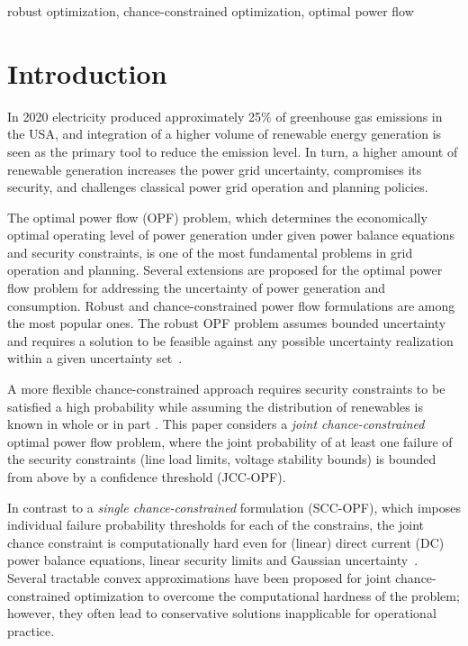 \documentclass{IEEEtran4PSCC}
\begin{document}
\begin{IEEEkeywords}
robust optimization, chance-constrained optimization, optimal power flow
\end{IEEEkeywords}



\section{Introduction}

In 2020 electricity produced approximately 25\% of greenhouse gas emissions in the USA, and integration of a higher volume of renewable energy generation is seen as the primary tool to reduce the emission level. In turn, a higher amount of renewable generation increases the power grid uncertainty, compromises its security, and challenges classical power grid operation and planning policies. 

The optimal power flow (OPF) problem, which determines the economically optimal operating level of power generation under given power balance equations and security constraints, is one of the most fundamental problems in grid operation and planning. Several extensions are proposed for the optimal power flow problem for addressing the uncertainty of power generation and consumption. Robust and chance-constrained power flow formulations are among the most popular ones. The robust OPF problem assumes bounded uncertainty and requires a solution to be feasible against any possible uncertainty realization within a given uncertainty set~\cite{ben2002robust,ding2016adjustable,sousa2010robust}. 

A more flexible chance-constrained approach requires security constraints to be satisfied a high probability while assuming the distribution of renewables is known in whole or in part \cite{lubin2015robust, roald2017chance,bienstock2014chance,pena2020dc}. This paper considers a {\it joint chance-constrained} optimal power flow problem, where the joint probability of at least one failure of the security constraints (line load limits, voltage stability bounds) is bounded from above by a confidence threshold (JCC-OPF). 

In contrast to a {\it single chance-constrained} formulation (SCC-OPF), which imposes individual failure probability thresholds for each of the constrains, the joint chance constraint is computationally hard even for (linear) direct current (DC) power balance equations, linear security limits and Gaussian uncertainty~\cite{cousins2014cubic,khachiyan1993complexity}. Several tractable convex approximations have been proposed \cite{nemirovski2007convex, nemirovski2006scenario,nemirovski2003tractable,trofino1999bi} for joint chance-constrained optimization to overcome the computational hardness of the problem; however, they often lead to conservative solutions inapplicable for operational practice. 
\end{document}
